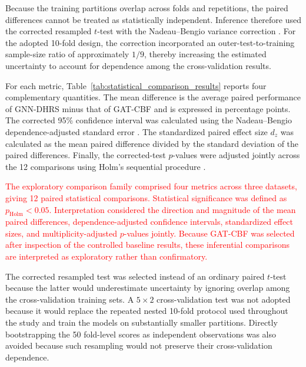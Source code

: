 \documentclass[pdflatex,sn-mathphys-num]{sn-jnl}%
\theoremstyle{thmstyleone}%
\theoremstyle{thmstyletwo}%
\theoremstyle{thmstylethree}%
\begin{document}
 {
Because the training partitions overlap across folds and repetitions, the
paired differences cannot be treated as statistically independent. Inference
therefore used the corrected resampled \(t\)-test with the Nadeau--Bengio
variance correction \cite{nadeau2003inference}. For the adopted 10-fold
design, the correction incorporated an outer-test-to-training sample-size
ratio of approximately \(1/9\), thereby increasing the estimated uncertainty
to account for dependence among the cross-validation results.
}

 {
For each metric, Table~\ref{tab:statistical_comparison_results} reports four
complementary quantities. The mean difference is the average paired
performance of GNN-DHRS minus that of GAT-CBF and is expressed in percentage
points. The corrected 95\% confidence interval was calculated using the
Nadeau--Bengio dependence-adjusted standard error
\cite{nadeau2003inference}. The standardized paired effect size \(d_z\) was
calculated as the mean paired difference divided by the standard deviation of
the paired differences. Finally, the corrected-test \(p\)-values were adjusted
jointly across the 12 comparisons using Holm's sequential procedure
\cite{holm1979simple}.
}

\textcolor{red}{
The exploratory comparison family comprised four metrics across three
datasets, giving 12 paired statistical comparisons. Statistical significance
was defined as \(p_{\mathrm{Holm}}<0.05\). Interpretation considered the
direction and magnitude of the mean paired differences, dependence-adjusted
confidence intervals, standardized effect sizes, and multiplicity-adjusted
\(p\)-values jointly. Because GAT-CBF was selected after inspection of the
controlled baseline results, these inferential comparisons are interpreted as
exploratory rather than confirmatory.
}

 {
The corrected resampled test was selected instead of an ordinary paired
\(t\)-test because the latter would underestimate uncertainty by ignoring
overlap among the cross-validation training sets. A \(5\times2\)
cross-validation test was not adopted because it would replace the repeated
nested 10-fold protocol used throughout the study and train the models on
substantially smaller partitions. Directly bootstrapping the 50 fold-level
scores as independent observations was also avoided because such resampling
would not preserve their cross-validation dependence.
}

\begingroup
 
\end{document}
